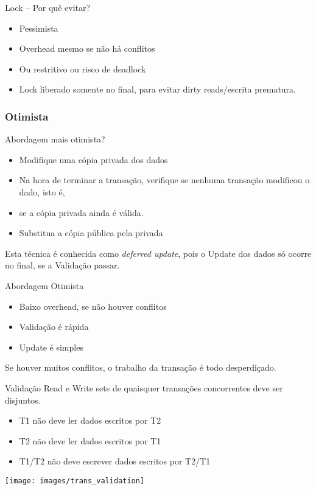 \begin{frame}{Lock -- Por quê evitar?}
\begin{itemize}
	\item Pessimista
	\item Overhead mesmo se não há conflitos
	\item Ou restritivo ou risco de deadlock
	\item Lock liberado somente no final, para evitar dirty reads/escrita prematura.
\end{itemize}
\end{frame}

\subsubsection{Otimista}
\begin{frame}{Abordagem mais otimista?}
\begin{itemize}
	\item Modifique uma cópia privada dos dados
	\item Na hora de terminar a transação, verifique se nenhuma transação modificou o dado, isto é,
	\item se a cópia privada ainda é válida.
	\item Substitua a cópia pública pela privada
\end{itemize}

Esta técnica é conhecida como \emph{deferred update}, pois o Update dos dados só ocorre no final, se a Validação passar.
\end{frame}

\begin{frame}{Abordagem Otimista}
\begin{itemize}
	\item Baixo overhead, se não houver conflitos
	\item Validação é rápida
	\item Update é simples
\end{itemize}

Se houver muitos conflitos, o trabalho da transação é todo desperdiçado.
\end{frame}

\begin{frame}{Validação}
Read e Write sets de quaisquer transações concorrentes deve ser disjuntos.
\begin{itemize}
	\item T1 não deve ler dados escritos por T2
	\item T2 não deve ler dados escritos por T1
	\item T1/T2 não deve escrever dados escritos por T2/T1
\end{itemize}
\texttt{[image: images/trans\_validation]}
\end{frame}

